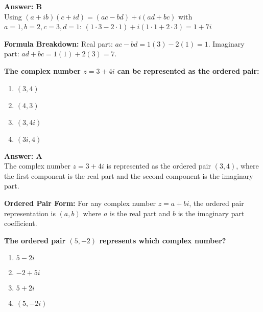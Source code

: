 \documentclass[12pt,a4paper]{article}
\begin{document}
\begin{answerstyle}
\textbf{Answer: B} \\
Using \( (a + ib)(c + id) = (ac - bd) + i(ad + bc) \) with \( a = 1, b = 2, c = 3, d = 1 \): \( (1 \cdot 3 - 2 \cdot 1) + i(1 \cdot 1 + 2 \cdot 3) = 1 + 7i \)
\end{answerstyle}

\begin{conceptbox}
\textbf{Formula Breakdown:} Real part: \( ac - bd = 1(3) - 2(1) = 1 \). Imaginary part: \( ad + bc = 1(1) + 2(3) = 7 \).
\end{conceptbox}

\newpage
\begin{questiontitle}[MCQ 48]
\textbf{The complex number \( z = 3 + 4i \) can be represented as the ordered pair:}
\end{questiontitle}

\begin{partbox}[Options]
\begin{enumerate}[label=\Alph*.]
    \item \( (3, 4) \)
    \item \( (4, 3) \)
    \item \( (3, 4i) \)
    \item \( (3i, 4) \)
\end{enumerate}
\end{partbox}

\begin{answerstyle}
\textbf{Answer: A} \\
The complex number \( z = 3 + 4i \) is represented as the ordered pair \( (3, 4) \), where the first component is the real part and the second component is the imaginary part.
\end{answerstyle}

\begin{conceptbox}
\textbf{Ordered Pair Form:} For any complex number \( z = a + bi \), the ordered pair representation is \( (a, b) \) where \( a \) is the real part and \( b \) is the imaginary part coefficient.
\end{conceptbox}

\newpage
\begin{questiontitle}[MCQ 49]
\textbf{The ordered pair \( (5, -2) \) represents which complex number?}
\end{questiontitle}

\begin{partbox}[Options]
\begin{enumerate}[label=\Alph*.]
    \item \( 5 - 2i \)
    \item \( -2 + 5i \)
    \item \( 5 + 2i \)
    \item \( (5, -2i) \)
\end{enumerate}
\end{partbox}
\end{document}
